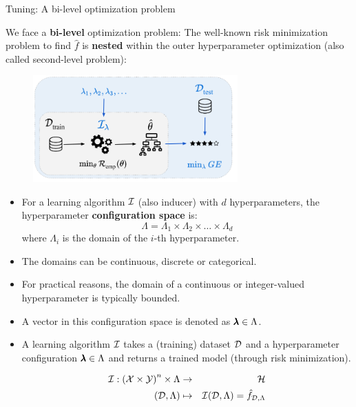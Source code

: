 \begin{frame}{Tuning: A bi-level optimization problem}

\vspace{0.2cm}

We face a \textbf{bi-level} optimization problem: The well-known risk minimization problem to find $\hat f$ is \textbf{nested} within the outer hyperparameter optimization (also called second-level problem):

\begin{center}
\begin{figure}
\includegraphics[width=0.7\textwidth]{images/riskmin_bilevel3.png}
\end{figure}
\end{center}

\framebreak

\begin{itemize}
\item For a learning algorithm $\mathcal{I}$ (also inducer) with $d$ hyperparameters, the hyperparameter \textbf{configuration space} is:
$$\Lambda=\Lambda_{1} \times \Lambda_{2} \times \ldots \times \Lambda_{d}$$
where $\Lambda_{i}$ is the domain of the $i$-th hyperparameter.
\item The domains can be continuous, discrete or categorical.
\item For practical reasons, the domain of a continuous or integer-valued hyperparameter is typically bounded.
\item A vector in this configuration space is denoted as $\pmb{\lambda} \in \Lambda$.
\item A learning algorithm $\mathcal{I}$ takes a (training) dataset $\mathcal{D}$ and a hyperparameter configuration $\pmb{\lambda} \in \Lambda$ and returns a trained model (through risk minimization).

\vspace*{-0.2cm}
\begin{eqnarray*}
\mathcal{I}: \left(\mathcal{X} \times \mathcal{Y}\right)^n \times \Lambda &\to& \mathcal{H} \\
(\mathcal{D}, \Lambda) &\mapsto& \mathcal{I}(\mathcal{D}, \Lambda) = \hat f_{\mathcal{D}, \Lambda}
\end{eqnarray*}
\end{itemize}


\end{frame}
